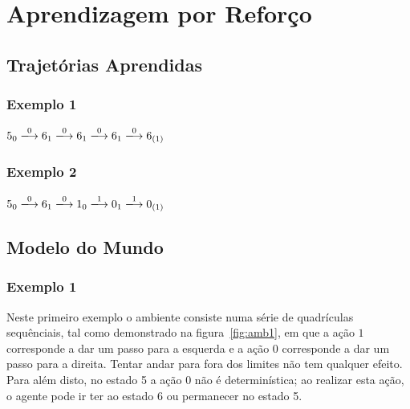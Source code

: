 \documentclass[a4paper,twocolumn]{article}
\begin{document}
    \section{Aprendizagem por Reforço}
    \subsection{Trajetórias Aprendidas}
    \subsubsection{Exemplo 1}
    $ 5_0 \xlongrightarrow{0} 6_1 \xlongrightarrow{0} 6_1 \xlongrightarrow{0} 6_1 \xlongrightarrow{0} 6_{(1)} $

    \subsubsection{Exemplo 2}
    $ 5_0 \xlongrightarrow{0} 6_1 \xlongrightarrow{0} 1_0 \xlongrightarrow{1} 0_1 \xlongrightarrow{1} 0_{(1)} $


    \subsection{Modelo do Mundo}
    \subsubsection{Exemplo 1}
    Neste primeiro exemplo o ambiente consiste numa série de quadrículas sequênciais, tal como demonstrado na
    figura~\ref{fig:amb1}, em que a ação $1$ corresponde a dar um passo para a esquerda e a ação $0$ corresponde a
    dar um passo para a direita. Tentar andar para fora dos limites não tem qualquer efeito.
    Para além disto, no estado 5 a ação 0 não é determinística; ao realizar esta ação, o agente pode ir ter ao estado
    6 ou permanecer no estado 5.
\end{document}
